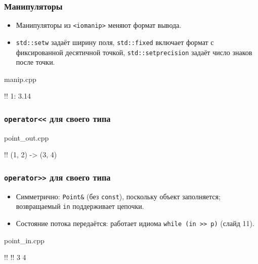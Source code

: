 \documentclass[compress, 8pt, aspectratio=169]{beamer}
\begin{document}
  \begin{frame}[fragile]

    \frametitle{Манипуляторы}

    \begin{itemize}

      \item Манипуляторы из \texttt{<iomanip>} меняют формат вывода.

      \item \texttt{std::setw} задаёт ширину поля, \texttt{std::fixed}
        включает формат с фиксированной десятичной точкой,
        \texttt{std::setprecision} задаёт число знаков после точки.

    \end{itemize}

        {manip.cpp}

    \begin{terminalwindow17}
!!
  1: 3.14
    \end{terminalwindow17}

  \end{frame}

  \begin{frame}[fragile]

    \frametitle{\texttt{operator<<} для своего типа}

        {point_out.cpp}

    \begin{terminalwindow17}
!!
(1, 2) -> (3, 4)
    \end{terminalwindow17}

  \end{frame}

  \begin{frame}[fragile]

    \frametitle{\texttt{operator>>} для своего типа}

    \begin{itemize}

      \item Симметрично: \texttt{Point\&} (без \texttt{const}),
        поскольку объект заполняется; возвращаемый
        \texttt{in} поддерживает цепочки.

      \item Состояние потока передаётся: работает идиома
        \texttt{while (in >> p)} (слайд 11).

    \end{itemize}

        {point_in.cpp}

    \begin{terminalwindow17}
!!
!!
3 4
    \end{terminalwindow17}

  \end{frame}
\end{document}
